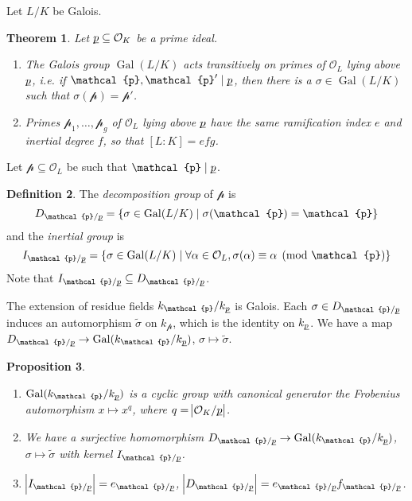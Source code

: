 \documentclass[11pt]{article}
\theoremstyle{definition}
\newtheorem{definition}{Definition}[section]
\theoremstyle{plain}
\newtheorem{theorem}[definition]{Theorem}
\newtheorem{proposition}[definition]{Proposition}
\theoremstyle{remark}
\DeclareMathOperator{\Gal}{Gal}
\newcommand{\cO}{\mathcal{O}}
\newcommand{\cp}{\mathcal{p}}
\newcommand{\up}{{\underline{\smash{p}}}}
\begin{document}
Let $L/K$ be Galois.

\begin{theorem}\label{thm:1_2}
    Let $\up \subseteq \cO_K$ be a prime ideal.
    \begin{enumerate}
        \item The Galois group $\Gal(L/K)$ acts transitively on primes of $\cO_L$ lying above $\up$, i.e. if $\cp, \cp' \mid \up$, then there is a $\sigma \in \Gal(L/K)$ such that $\sigma(\cp) = \cp'$.

        \item Primes $\cp_1, \ldots, \cp_g$ of $\cO_L$ lying above $\up$ have the same ramification index $e$ and inertial degree $f$, so that $[L : K] = e f g$.
    \end{enumerate}
\end{theorem}

\noindent Let $\cp \subseteq \cO_L$ be such that $\cp \mid \up$.

\begin{definition}
    The \emph{decomposition group} of $\cp$ is
    \begin{equation*}
        D_{\cp / \up} = \{\sigma \in \Gal(L/K) \mid \sigma(\cp) = \cp\}
    \end{equation*}
    and the \emph{inertial group} is
    \begin{equation*}
        I_{\cp / \up} = \{\sigma \in \Gal(L/K) \mid \forall \alpha \in \cO_L, \sigma(\alpha) \equiv \alpha \pmod{\cp}\}
    \end{equation*}
    Note that $I_{\cp/\up} \subseteq D_{\cp/\up}$.
\end{definition}

The extension of residue fields $k_\cp / k_\up$ is Galois. Each $\sigma \in D_{\cp / \up}$ induces an automorphism $\widetilde{\sigma}$ on $k_\cp$, which is the identity on $k_\up$. We have a map $D_{\cp / \up} \to \Gal(k_\cp / k_\up)$, $\sigma \mapsto \widetilde{\sigma}$.

\begin{proposition}\label{prop:1_4}\phantom{}
    \begin{enumerate}
        \item $\Gal(k_\cp / k_\up)$ is a cyclic group with canonical generator the Frobenius automorphism $x \mapsto x^q$, where $q = \abs{\cO_K / \up}$.

        \item We have a surjective homomorphism $D_{\cp / \up} \to \Gal(k_\cp / k_\up)$, $\sigma \mapsto \widetilde{\sigma}$ with kernel $I_{\cp / \up}$.

        \item $\abs{I_{\cp / \up}} = e_{\cp / \up}$, $\abs{D_{\cp / \up}} = e_{\cp / \up} f_{\cp / \up}$.
    \end{enumerate}
\end{proposition}
\end{document}
